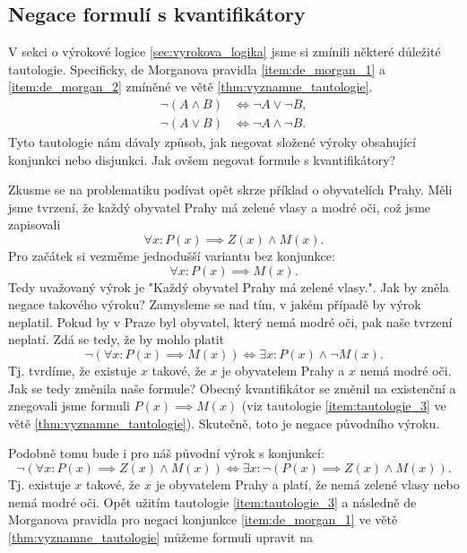 \subsection{Negace formulí s kvantifikátory}
V sekci o výrokové logice \ref{sec:vyrokova_logika} jsme si zmínili některé důležité tautologie. Specificky, de Morganova pravidla \ref{item:de_morgan_1} a \ref{item:de_morgan_2} zmíněné ve větě \ref{thm:vyznamne_tautologie}.
\begin{align*}
    \neg (A \land B) &\iff \neg A \lor \neg B,\\
    \neg (A \lor B) &\iff \neg A \land \neg B.
\end{align*}
Tyto tautologie nám dávaly způsob, jak negovat složené výroky obsahující konjunkci nebo disjunkci. Jak ovšem negovat formule s kvantifikátory?\par
Zkusme se na problematiku podívat opět skrze příklad o obyvatelích Prahy. Měli jsme tvrzení, že každý obyvatel Prahy má zelené vlasy a modré oči, což jsme zapisovali
\begin{equation*}
    \forall x : P(x)\implies Z(x) \land M(x).
\end{equation*}
Pro začátek si vezměme jednodušší variantu bez konjunkce:
\begin{equation*}
    \forall x : P(x)\implies M(x).
\end{equation*}
Tedy uvažovaný výrok je "Každý obyvatel Prahy má zelené vlasy.". Jak by zněla negace takového výroku? Zamysleme se nad tím, v jakém případě by výrok neplatil. Pokud by v Praze byl obyvatel, který nemá modré oči, pak naše tvrzení neplatí. Zdá se tedy, že by mohlo platit
\begin{equation*}
    \neg(\forall x : P(x)\implies M(x)) \iff \exists x: P(x) \land \neg M(x).
\end{equation*}
Tj. tvrdíme, že existuje $x$ takové, že $x$ je obyvatelem Prahy a $x$ nemá modré oči. Jak se tedy změnila naše formule? Obecný kvantifikátor se změnil na existenční a znegovali jsme formuli $P(x)\implies M(x)$ (viz tautologie \ref{item:tautologie_3} ve větě \ref{thm:vyznamne_tautologie}). Skutečně, toto je negace původního výroku.\par
Podobně tomu bude i pro náš původní výrok s konjunkcí:
\begin{equation*}
    \neg(\forall x : P(x)\implies Z(x) \land M(x)) \iff \exists x : \neg (P(x)\implies Z(x) \land M(x)).
\end{equation*}
Tj. existuje $x$ takové, že $x$ je obyvatelem Prahy a platí, že nemá zelené vlasy nebo nemá modré oči. Opět užitím tautologie \ref{item:tautologie_3} a následně de Morganova pravidla pro negaci konjunkce \ref{item:de_morgan_1} ve větě \ref{thm:vyznamne_tautologie} můžeme formuli upravit na
